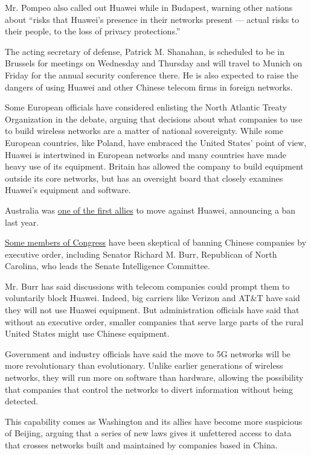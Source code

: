 Mr. Pompeo also called out Huawei while in Budapest, warning other
nations about ``risks that Huawei's presence in their networks present
--- actual risks to their people, to the loss of privacy protections.''

The acting secretary of defense, Patrick M. Shanahan, is scheduled to be
in Brussels for meetings on Wednesday and Thursday and will travel to
Munich on Friday for the annual security conference there. He is also
expected to raise the dangers of using Huawei and other Chinese telecom
firms in foreign networks.

Some European officials have considered enlisting the North Atlantic
Treaty Organization in the debate, arguing that decisions about what
companies to use to build wireless networks are a matter of national
sovereignty. While some European countries, like Poland, have embraced
the United States' point of view, Huawei is intertwined in European
networks and many countries have made heavy use of its equipment.
Britain has allowed the company to build equipment outside its core
networks, but has an oversight board that closely examines Huawei's
equipment and software.

Australia was
\href{https://www.nytimes.com/2018/08/23/technology/huawei-banned-australia-5g.html}{one
of the first allies} to move against Huawei, announcing a ban last year.

\href{https://www.nytimes.com/2019/02/06/us/politics/richard-burr-china-huawei-5g.html}{Some
members of Congress} have been skeptical of banning Chinese companies by
executive order, including Senator Richard M. Burr, Republican of North
Carolina, who leads the Senate Intelligence Committee.

Mr. Burr has said discussions with telecom companies could prompt them
to voluntarily block Huawei. Indeed, big carriers like Verizon and AT\&T
have said they will not use Huawei equipment. But administration
officials have said that without an executive order, smaller companies
that serve large parts of the rural United States might use Chinese
equipment.

Government and industry officials have said the move to 5G networks will
be more revolutionary than evolutionary. Unlike earlier generations of
wireless networks, they will run more on software than hardware,
allowing the possibility that companies that control the networks to
divert information without being detected.

This capability comes as Washington and its allies have become more
suspicious of Beijing, arguing that a series of new laws gives it
unfettered access to data that crosses networks built and maintained by
companies based in China.

